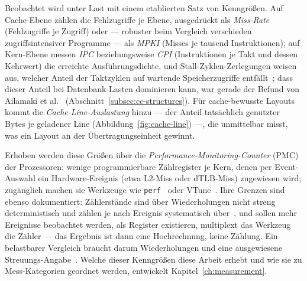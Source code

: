 Beobachtet wird unter Last mit einem etablierten Satz von Kenngrößen. Auf Cache-Ebene zählen die
Fehlzugriffe je Ebene, ausgedrückt als \emph{Miss-Rate} (Fehlzugriffe je Zugriff) oder --- robuster
beim Vergleich verschieden zugriffsintensiver Programme --- als \emph{MPKI} (Misses je tausend
Instruktionen); auf Kern-Ebene messen \emph{IPC} beziehungsweise \emph{CPI} (Instruktionen je Takt
und dessen Kehrwert) die erreichte Ausführungsdichte, und Stall-Zyklen-Zerlegungen weisen aus,
welcher Anteil der Taktzyklen auf wartende Speicherzugriffe
entfällt~\cite{hennessy2019architecture}; dass dieser Anteil bei Datenbank-Lasten dominieren kann,
war gerade der Befund von Ailamaki et al.~\cite{ailamaki1999dbms}
(Abschnitt~\ref{subsec:cc-structures}). Für cache-bewusste Layouts kommt die
\emph{Cache-Line-Auslastung} hinzu --- der Anteil tatsächlich genutzter Bytes je geladener Line
(Abbildung~\ref{fig:cache-line}) ---, die unmittelbar misst, was ein Layout an der
Übertragungseinheit gewinnt.

Erhoben werden diese Größen über die \emph{Performance-Monitoring-Counter} (PMC) der Prozessoren:
wenige programmierbare Zählregister je Kern, denen per Event-Auswahl ein Hardware-Ereignis (etwa
L2-Miss oder dTLB-Miss) zugewiesen wird; zugänglich machen sie Werkzeuge wie
\texttt{perf}~\cite{demelo2010perf} oder VTune~\cite{reinders2005vtune}. Ihre Grenzen sind ebenso
dokumentiert: Zählerstände sind über Wiederholungen nicht streng deterministisch und zählen je nach
Ereignis systematisch über~\cite{weaver2008counters}, und sollen mehr Ereignisse beobachtet werden,
als Register existieren, multiplext das Werkzeug die Zähler --- das Ergebnis ist dann eine
Hochrechnung, keine Zählung. Ein belastbarer Vergleich braucht darum Wiederholungen und eine ausgewiesene
Streuungs-Angabe~\cite{hoefler2015benchmarking,weaver2008counters}. Welche dieser Kenngrößen diese
Arbeit erhebt und wie sie zu Mess-Kategorien geordnet werden, entwickelt
Kapitel~\ref{ch:measurement}.

